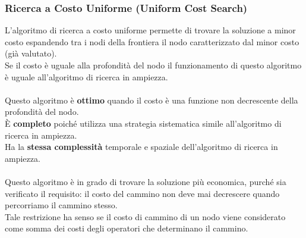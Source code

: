 \documentclass[../main.tex]{subfiles}
\begin{document}
	\subsubsection{Ricerca a Costo Uniforme (Uniform Cost Search)} 
	L'algoritmo di ricerca a costo uniforme permette di trovare la soluzione a minor costo espandendo tra i nodi della frontiera il nodo caratterizzato dal minor costo (già valutato). \\
	Se il costo è uguale alla profondità del nodo il funzionamento di questo algoritmo è uguale all'algoritmo di ricerca in ampiezza. \\ \\
	Questo algoritmo è \textbf{ottimo} quando il costo è una funzione non decrescente della profondità del nodo. \\
	È \textbf{completo} poiché utilizza una strategia sistematica simile all'algoritmo di ricerca in ampiezza. \\
	Ha la \textbf{stessa complessità} temporale e spaziale dell'algoritmo di ricerca in ampiezza.\\ \\
	Questo algoritmo è in grado di trovare la soluzione più economica, purché sia verificato il requisito: il costo del cammino non deve mai decrescere quando percorriamo il cammino stesso.\\
	Tale restrizione ha senso se il costo di cammino di un nodo viene considerato come somma dei costi degli operatori che determinano il cammino.
\end{document}
